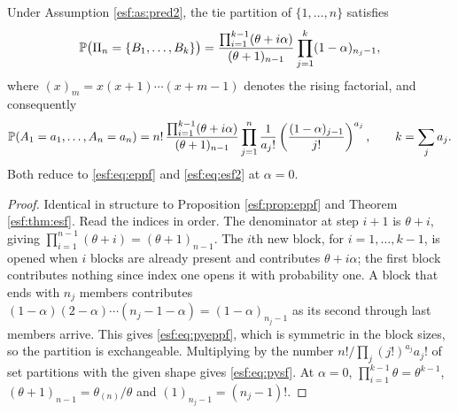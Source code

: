 \begin{theorem}
\label{esf:thm:py}
Under Assumption \ref{esf:as:pred2}, the tie partition of $\{1,\dots,n\}$
satisfies
\begin{equation}
\mathbb{P}\bigl( \Pi_n = \{B_1,\dots,B_k\} \bigr)
= \frac{\prod_{i=1}^{k-1} (\theta + i \alpha)}{(\theta+1)_{n-1}}
\prod_{j=1}^{k} (1-\alpha)_{n_j - 1},
\label{esf:eq:pyeppf}
\end{equation}
where $(x)_m = x (x+1) \cdots (x+m-1)$ denotes the rising factorial,
and consequently
\begin{equation}
\mathbb{P}(A_1 = a_1, \dots, A_n = a_n)
= n! \, \frac{\prod_{i=1}^{k-1}(\theta+i\alpha)}{(\theta+1)_{n-1}}
\prod_{j=1}^{n} \frac{1}{a_j!} \left( \frac{(1-\alpha)_{j-1}}{j!} \right)^{a_j},
\qquad k = \sum_j a_j .
\label{esf:eq:pysf}
\end{equation}
Both reduce to \eqref{esf:eq:eppf} and \eqref{esf:eq:esf2} at $\alpha = 0$.
\end{theorem}

\begin{proof}
Identical in structure to Proposition \ref{esf:prop:eppf} and Theorem \ref{esf:thm:esf}. Read
the indices in order. The denominator at step $i+1$ is $\theta+i$, giving
$\prod_{i=1}^{n-1}(\theta+i) = (\theta+1)_{n-1}$. The $i$th new block, for
$i = 1, \dots, k-1$, is opened when $i$ blocks are already present and contributes
$\theta + i \alpha$; the first block contributes nothing since index one opens it with
probability one. A block that ends with $n_j$ members contributes
$(1-\alpha)(2-\alpha)\cdots(n_j-1-\alpha) = (1-\alpha)_{n_j-1}$ as its second through
last members arrive. This gives \eqref{esf:eq:pyeppf}, which is symmetric in the block
sizes, so the partition is exchangeable. Multiplying by the number
$n!/\prod_j (j!)^{a_j} a_j!$ of set partitions with the given shape gives
\eqref{esf:eq:pysf}. At $\alpha = 0$, $\prod_{i=1}^{k-1}\theta = \theta^{k-1}$,
$(\theta+1)_{n-1} = \theta_{(n)}/\theta$ and $(1)_{n_j-1} = (n_j-1)!$.
\end{proof}

